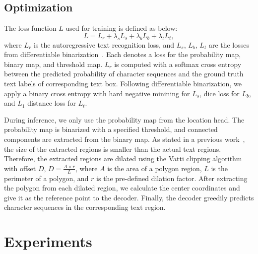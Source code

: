 \documentclass[10pt,twocolumn,letterpaper]{article}
\begin{document}
\subsection{Optimization}

The loss function \(L\) used for training is defined as below:
\begin{equation}
L = L_{r}  + \lambda_s L_s + \lambda_b L_{b} + \lambda_t L_{t},
\end{equation}
where \(L_r\) is the autoregressive text recognition loss, and \(L_s\), \(L_b\), \(L_t\) are the losses from differentiable binarization~\cite{liao2020real}. Each denotes a loss for the probability map, binary map, and threshold map. \(L_r\) is computed with a softmax cross entropy between the predicted probability of character sequences and the ground truth text labels of corresponding text box. Following differentiable binarization, we apply a binary cross entropy with hard negative minining for \(L_s\), dice loss for \(L_b\), and \(L_1\) distance loss for \(L_t\).



















During inference, we only use the probability map from the location head. The probability map is binarized with a specified threshold, and connected components are extracted from the binary map. As stated in a previous work~\cite{liao2020real}, the size of the extracted regions is smaller than the actual text regions. Therefore, the extracted regions are dilated using the Vatti clipping algorithm with offset \(D\), \(D = \frac{A\times r}{L}\),
where \(A\) is the area of a polygon region, \(L\) is the perimeter of a polygon, and \(r\) is the pre-defined dilation factor. After extracting the polygon from each dilated region, we calculate the center coordinates and give it as the reference point to the decoder. Finally, the decoder greedily predicts character sequences in the corresponding text region.

 
\section{Experiments}
\end{document}
